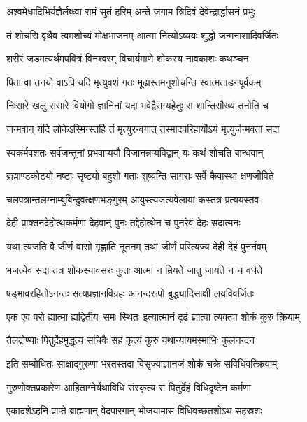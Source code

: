\twolineshloka
{अश्वमेधादिभिर्यज्ञैर्लब्ध्वा रामं सुतं हरिम्}
{अन्ते जगाम त्रिदिवं देवेन्द्रार्द्धासनं प्रभुः} %

\twolineshloka
{तं शोचसि वृथैव त्वमशोच्यं मोक्षभाजनम्}
{आत्मा नित्योऽव्ययः शुद्धो जन्मनाशादिवर्जितः} %

\twolineshloka
{शरीरं जडमत्यर्थमपवित्रं विनश्वरम्}
{विचार्यमाणे शोकस्य नावकाशः कथञ्चन} %

\twolineshloka
{पिता वा तनयो वाऽपि यदि मृत्युवशं गतः}
{मूढास्तमनुशोचन्ति स्वात्मताडनपूर्वकम्} %

\twolineshloka
{निःसारे खलु संसारे वियोगो ज्ञानिनां यदा}
{भवेद्वैराग्यहेतुः स शान्तिसौख्यं तनोति च} %

\twolineshloka
{जन्मवान् यदि लोकेऽस्मिन्स्तर्हि तं मृत्युरन्वगात्}
{तस्मादपरिहार्योऽयं मृत्युर्जन्मवतां सदा} %

\twolineshloka
{स्वकर्मवशतः सर्वजन्तूनां प्रभवाप्ययौ}
{विजानन्नप्यविद्वान् यः कथं शोचति बान्धवान्} %

\twolineshloka
{ब्रह्माण्डकोटयो नष्टाः सृष्टयो बहुशो गताः}
{शुष्यन्ति सागराः सर्वे कैवास्था क्षणजीविते} %

\twolineshloka
{चलपत्रान्तलग्नाम्बुबिन्दुवत्क्षणभङ्गुरम्}
{आयुस्त्यजत्यवेलायां कस्तत्र प्रत्ययस्तव} %

\twolineshloka
{देही प्राक्तनदेहोत्थकर्मणा देहवान् पुनः}
{तद्देहोत्थेन च पुनरेवं देहः सदात्मनः} %

\twolineshloka
{यथा त्यजति वै जीर्णं वासो गृह्णाति नूतनम्}
{तथा जीर्णं परित्यज्य देही देहं पुनर्नवम्} %

\twolineshloka
{भजत्येव सदा तत्र शोकस्यावसरः कुतः}
{आत्मा न म्रियते जातु जायते न च वर्धते} %

\twolineshloka
{षड्भावरहितोऽनन्तः सत्यप्रज्ञानविग्रहः}
{आनन्दरूपो बुद्ध्यादिसाक्षी लयविवर्जितः} %

\twolineshloka
{एक एव परो ह्यात्मा ह्यद्वितीयः समः स्थितः}
{इत्यात्मानं दृढं ज्ञात्वा त्यक्त्वा शोकं कुरु क्रियाम्} %

\twolineshloka
{तैलद्रोण्याः पितुर्देहमुद्धृत्य सचिवैः सह}
{कृत्यं कुरु यथान्यायमस्माभिः कुलनन्दन} %

\twolineshloka
{इति सम्बोधितः साक्षाद्गुरुणा भरतस्तदा}
{विसृज्याज्ञानजं शोकं चक्रे सविधिवत्क्रियाम्} %

\twolineshloka
{गुरुणोक्तप्रकारेण आहिताग्नेर्यथाविधि}
{संस्कृत्य स पितुर्देहं विधिदृष्टेन कर्मणा} %

\twolineshloka
{एकादशेऽहनि प्राप्ते ब्राह्मणान् वेदपारगान्}
{भोजयामास विधिवच्छतशोऽथ सहस्रशः} %

